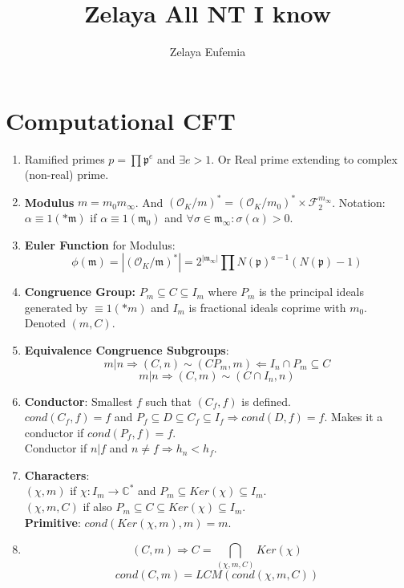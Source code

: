 \documentclass{article}
\title{Zelaya All NT I know}
\author{Zelaya Eufemia}
\date{}
\newcommand{\C}{\mathbb{C}}
\newcommand{\OO}{\mathcal{O}}
\newcommand{\pp}{\mathfrak{p}}
\newcommand{\mm}{\mathfrak{m}}
\newcommand{\FF}{\mathcal{F}}
\newcommand{\ra}{\rightarrow}
\newcommand{\Ra}{\Rightarrow}
\newcommand{\La}{\Leftarrow}
\begin{document}
\maketitle
\section{Computational CFT}
\begin{multicols}{2}
\begin{enumerate}
\item Ramified primes $p = \prod \pp^e$ and $\exists e > 1$. Or Real prime extending to complex (non-real) prime. 

\item \textbf{Modulus} $m = m_0 m_\infty$. And $(\OO_K/m)^* = (\OO_K/m_0)^* \times \FF_2^{m_\infty}$. Notation: $\alpha \equiv 1 (*\mm)$ if $\alpha \equiv 1 (\mm_0)$ and $\forall \sigma \in \mm_\infty: \sigma(\alpha) > 0$. 

\item \textbf{Euler Function} for Modulus: 
\[\phi(\mm) = |(\OO_K/\mm)^*| = 2^{|\mm_\infty|}\prod N(\pp)^{a-1}(N(\pp) - 1)\]

\item \textbf{Congruence Group:} $P_m \subseteq C \subseteq I_m$ where $P_m$ is the principal ideals generated by $\equiv 1 (*m)$ and $I_m$ is fractional ideals coprime with $m_0$. Denoted $(m,C)$.

\item \textbf{Equivalence Congruence Subgroups}: 
\[m|n \Ra (C,n) \sim (CP_m,m) \La I_n \cap P_m \subseteq C\]
\[m|n \Ra (C,m) \sim (C \cap I_n, n)\]

\item \textbf{Conductor}: Smallest $f$ such that $(C_f,f)$ is defined.\\
$cond(C_f,f) = f$ and $P_f \subseteq D \subseteq C_f\subseteq I_f \Ra cond(D,f) = f$. Makes it a conductor if $cond(P_f,f) = f$. \\
Conductor if $n|f$ and $n \neq f \Ra h_n < h_f$. 

\item \textbf{Characters}: \\
$(\chi,m)$ if $\chi:I_m \ra \C^*$ and $P_m \subseteq Ker(\chi) \subseteq I_m$.\\
$(\chi,m, C)$ if also $P_m \subseteq C \subseteq Ker(\chi) \subseteq I_m$.\\
\textbf{Primitive}: $cond(Ker(\chi,m),m) = m$.

\item
\[(C,m) \Ra C = \bigcap_{(\chi,m,C)}Ker(\chi)\]
\[cond(C,m) = LCM(cond(\chi,m,C))\]


\end{enumerate}
\end{multicols}
\end{document}
